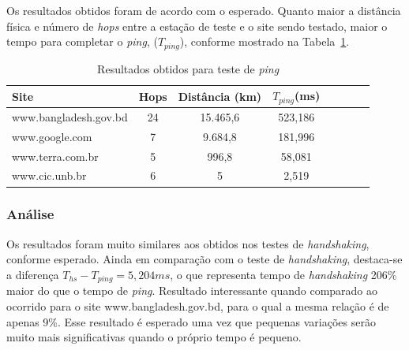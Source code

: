 \documentclass[12pt,a4paper]{report}
\begin{document}
Os resultados obtidos foram de acordo com o esperado. Quanto maior a distância física e número de \textit{hops} entre a estação de teste e o site sendo testado, maior o tempo para completar o \textit{ping}, (\(T_{ping}\)), conforme mostrado na Tabela~\ref{tab:resultsping}.

\begin{table}[h]
	\center
	\begin{tabular}{l*{6}{c}r}
	Site						& Hops	& Distância (km)	& \(T_{ping}\)(ms)\\
	\hline
	www.bangladesh.gov.bd		& 24		& 15.465,6		& 523,186\\
	www.google.com		& 7		& 9.684,8		& 181,996\\
	www.terra.com.br				& 5		& 996,8			& 58,081\\
	www.cic.unb.br				& 6		& 5				& 2,519\\
	\end{tabular}
	\caption{Resultados obtidos para teste de \textit{ping}}
	\label{tab:resultsping}
\end{table}

\subsubsection*{Análise}

Os resultados foram muito similares aos obtidos nos testes de \textit{handshaking}, conforme esperado. Ainda em comparação com o teste de \textit{handshaking}, destaca-se a diferença \(T_{hs} - T_{ping} = 5,204 ms\), o que representa tempo de \textit{handshaking} 206\% maior do que o tempo de \textit{ping}. Resultado interessante quando comparado ao ocorrido para o site www.bangladesh.gov.bd, para o qual a mesma relação é de apenas 9\%. Esse resultado é esperado uma vez que pequenas variações serão muito mais significativas quando o próprio tempo é pequeno.
\end{document}
